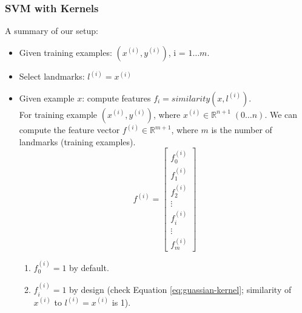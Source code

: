    \subsubsection{SVM with Kernels}
        A summary of our setup:
        \begin{itemize}
            \item Given training examples:  $(x^{(i)}, y^{(i)})$, i = $1\dots m$.
            \item Select landmarks:         $l^{(i)} = x^{(i)}$
            \item Given example $x$:   compute features $f_i = similarity(x, l^{(i)})$. \\
                For training example $(x^{(i)}, y^{(i)})$, where $x^{(i)} \in \mathbb{R}^{n+1} \; (0 \dots n)$. We can compute the feature vector $f^{(i)} \in \mathbb{R}^{m+1}$, where $m$ is the number of landmarks (training examples).
                \[
                f^{(i)} = \begin{bmatrix}
                    f_0^{(i)}   \\
                    f_1^{(i)}   \\
                    f_2^{(i)}   \\
                    \vdots      \\
                    f_i^{(i)}   \\
                    \vdots      \\
                    f_m^{(i)}
                            \end{bmatrix}
                \] 
                \begin{enumerate}
                    \item $f_0^{(i)} = 1$ by default.
                    \item $f_i^{(i)} = 1$ by design (check Equation \ref{eq:guassian-kernel}; similarity of $x^{(i)}$ to $l^{(i)}= x^{(i)}$ is 1).
                \end{enumerate}
                    
        \end{itemize}


